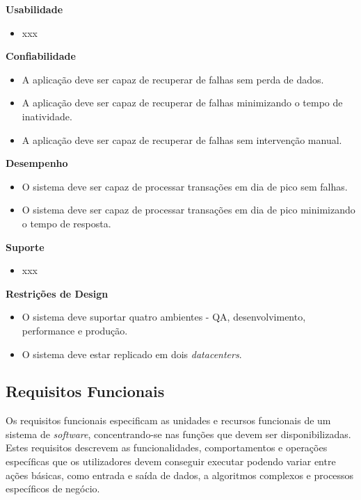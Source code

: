 \textbf{Usabilidade}
\begin{itemize}
  \item xxx
\end{itemize}

\textbf{Confiabilidade}
\begin{itemize}
  \item A aplicação deve ser capaz de recuperar de falhas sem perda de dados.
  \item A aplicação deve ser capaz de recuperar de falhas minimizando o tempo de inatividade.
  \item A aplicação deve ser capaz de recuperar de falhas sem intervenção manual.
\end{itemize}

\textbf{Desempenho}
\begin{itemize}
  \item O sistema deve ser capaz de processar transações em dia de pico sem falhas.
  \item O sistema deve ser capaz de processar transações em dia de pico minimizando o tempo de resposta.
\end{itemize}

\textbf{Suporte}
\begin{itemize}
  \item xxx
\end{itemize}

\textbf{Restrições de Design}
\begin{itemize}
  \item O sistema deve suportar quatro ambientes - \ac{QA}, desenvolvimento, 
    performance e produção.
  \item O sistema deve estar replicado em dois \textit{datacenters}.
\end{itemize}

\subsection{Requisitos Funcionais}
\label{sec:3-rf}

Os requisitos funcionais especificam as unidades e recursos funcionais de um sistema de 
\textit{software}, concentrando-se nas funções que devem ser disponibilizadas. Estes requisitos 
descrevem as funcionalidades, comportamentos e operações específicas que os utilizadores devem 
conseguir executar podendo variar entre ações básicas, como entrada e saída de dados, a algoritmos 
complexos e processos específicos de negócio.

